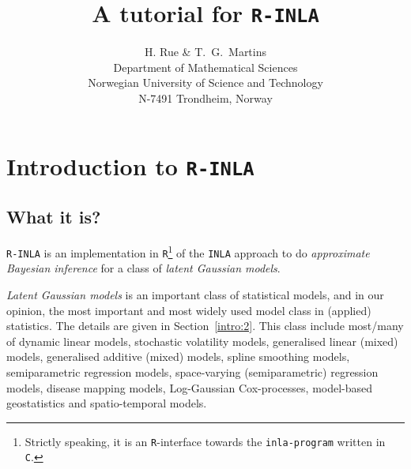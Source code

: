 \documentclass[a4paper,11pt]{report}
\newcommand{\tv}{\texttt}
\def\Sec#1{Section~\ref{#1}}
\begin{document}


\title{A tutorial for \tv{R-INLA}}
\author{H. Rue \& T.\ G.\ Martins\\
 Department of Mathematical Sciences\\
 Norwegian University of Science and Technology\\
 N-7491 Trondheim, Norway}
\maketitle




\chapter{Introduction to \tv{R-INLA}}
\label{intro:0}

\section{What it is?}
\label{intro:1}

\tv{R-INLA} is an implementation in \tv{R}\footnote{Strictly speaking,
    it is an \tv{R}-interface towards the \tv{inla-program} written in
    \tv{C}.} of the \tv{INLA} approach to do \emph{approximate
    Bayesian inference} for a class of \emph{latent Gaussian models}.

\emph{Latent Gaussian models} is an important class of statistical
models, and in our opinion, the most important and most widely used
model class in (applied) statistics. The details are given in
\Sec{intro:2}. This class include most/many of dynamic linear models,
stochastic volatility models, generalised linear (mixed) models,
generalised additive (mixed) models, spline smoothing models,
semiparametric regression models, space-varying (semiparametric)
regression models, disease mapping models, Log-Gaussian Cox-processes,
model-based geostatistics and spatio-temporal models.
\end{document}
